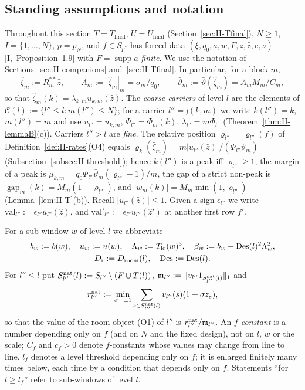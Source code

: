 \documentclass[10pt]{amsart}
\theoremstyle{definition}
\theoremstyle{remark}
\newcommand{\supp}{\operatorname{supp}}
\newcommand{\gap}{\operatorname{gap}}
\newcommand{\zh}{\hat z}
\begin{document}
\subsection*{Standing assumptions and notation}
Throughout this section $T=T_{\mathrm{final}}$, $U=U_{\mathrm{final}}$
(Section~\ref{sec:II-Tfinal}), $N\ge1$, $I=\{1,\dots,N\}$, $p=p_N$, and
$f\in S_{p^*}$ has forced data $(\xi,q_0,a,w,F,z,\zh,e,\nu)$
[I,~Proposition~1.9] with $F=\supp a$ \emph{finite}.  We use the notation
of Sections~\ref{sec:II-companions} and~\ref{sec:II-Tfinal}.  In
particular, for a block $m$,
\[
 \hat\zeta_m:=R_m^{**}\zh,\qquad A_m:=|\hat\zeta_m|_m=\sigma_m/q_0,\qquad
 \bar\vartheta_m:=\bar\vartheta(\hat\zeta_m)=A_mM_m/C_m ,
\]
so that $\hat\zeta_m(k)=\lambda_{k,m}u_{k,m}(\zh)$.  The \emph{coarse
carriers} of level $l$ are the elements of $\mathcal C(l):=\{l''\le l:
m(l'')\le N\}$; for a carrier $l''=\mathfrak j(k,m)$ we write $k(l'')=k$,
$m(l'')=m$ and use $u_{l''}=u_{k,m}$, $\Phi_{l''}=\Phi_m(k)$,
$\lambda_{l''}=m\Phi_{l''}$ (Theorem~\ref{thm:II-lemmaB}(c)).  Carriers
$l''>l$ are \emph{fine}.  The relative position
$\varrho_{l''}=\varrho_{l''}(f)$ of Definition~\ref{def:II-rates}(O4) equals
$\varrho_{k}(\hat\zeta_m)=m|u_{l''}(\zh)|/(\Phi_{l''}\bar\vartheta_m)$
(Subsection~\ref{subsec:II-threshold}); hence $k(l'')$ is a peak iff
$\varrho_{l''}\ge1$, the margin of a peak is
$\mu_{k,m}=q_0\Phi_{l''}\bar\vartheta_m(\varrho_{l''}-1)/m$, the gap of a strict
non-peak is $\gap_m(k)=M_m(1-\varrho_{l''})$, and $|w_m(k)|=M_m\min(1,
\varrho_{l''})$ (Lemma~\ref{lem:II-T}(b)).  Recall $|u_{l''}(\zh)|\le1$.
Given a sign $\epsilon_{l''}$ we write $\mathrm{val}_{l''}:=\epsilon_{l''}
u_{l''}(\zh)$, and $\mathrm{val}'_{l''}:=\epsilon_{l''}u_{l''}(\zh')$ at
another first row $f'$.

For a sub-window $w$ of level $l$ we abbreviate
\begin{gather*}
 b_w:=b(w),\quad u_w:=u(w),\quad \Lambda_w:=T_{\rm lo}(w)^3,\quad
 \beta_w:=b_w+\mathrm{Des}(l)^2\Lambda_w^2,\\
 D_{\rm r}:=D_{\rm room}(l),\quad \mathrm{Des}:=\mathrm{Des}(l).
\end{gather*}
For $l''\le l$ put $S^{\rm nat}_{l''}(l):=S_{l''}\setminus(F\cup T(l))$,
$\mathfrak m_{l''}:=\|v_{l''}1_{S^{\rm nat}_{l''}(l)}\|_1$ and
\[
 r^{\rm nat}_{l''}:=\min_{\sigma=\pm1}\sum_{s\in S^{\rm nat}_{l''}(l)}
 v_{l''}(s)(1+\sigma z_s),
\]
so that the value of the room object (O1) of $l''$ is $r^{\rm nat}_{l''}/
\mathfrak m_{l''}$.  An \emph{$f$-constant} is a number depending only on
$f$ (and on $N$ and the fixed design), not on $l$, $w$ or the scale; $C_f$
and $c_f>0$ denote $f$-constants whose values may change from line to line.
$l_f$ denotes a level threshold depending only on $f$; it is enlarged
finitely many times below, each time by a condition that depends only on
$f$.  Statements ``for $l\ge l_f$'' refer to sub-windows of level $l$.
\end{document}
